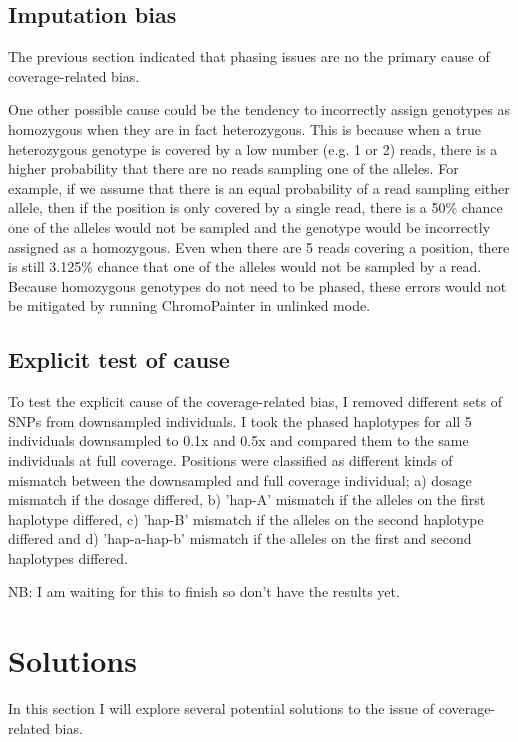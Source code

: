 \subsection{Imputation bias}

The previous section indicated that phasing issues are no the primary cause of coverage-related bias.

One other possible cause could be the tendency to incorrectly assign genotypes as homozygous when they are in fact heterozygous. This is because when a true heterozygous genotype is covered by a low number (e.g. 1 or 2) reads, there is a higher probability that there are no reads sampling one of the alleles. For example, if we assume that there is an equal probability of a read sampling either allele, then if the position is only covered by a single read, there is a 50\% chance one of the alleles would not be sampled and the genotype would be incorrectly assigned as a homozygous. Even when there are 5 reads covering a position, there is still 3.125\% chance that one of the alleles would not be sampled by a read. Because homozygous genotypes do not need to be phased, these errors would not be mitigated by running ChromoPainter in unlinked mode.

\subsection{Explicit test of cause}

To test the explicit cause of the coverage-related bias, I removed different sets of SNPs from downsampled individuals. I took the phased haplotypes for all 5 individuals downsampled to 0.1x and 0.5x and compared them to the same individuals at full coverage. Positions were classified as different kinds of mismatch between the downsampled and full coverage individual; a) dosage mismatch if the dosage differed, b) 'hap-A' mismatch if the alleles on the first haplotype differed, c) 'hap-B' mismatch if the alleles on the second haplotype differed and d) 'hap-a-hap-b' mismatch if the alleles on the first and second haplotypes differed. 

NB: I am waiting for this to finish so don't have the results yet. 

\section{Solutions}

In this section I will explore several potential solutions to the issue of coverage-related bias.

